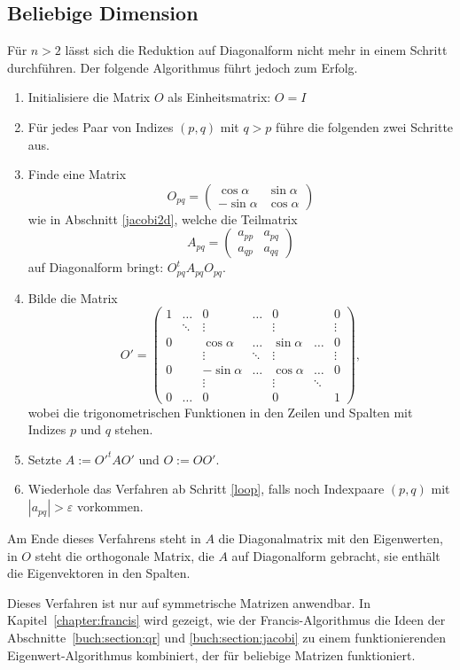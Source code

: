 \subsection{Beliebige Dimension}
Für $n>2$ lässt sich die Reduktion auf Diagonalform nicht mehr in einem
Schritt durchführen. Der folgende Algorithmus führt jedoch zum Erfolg.
\begin{enumerate}
\item Initialisiere die Matrix $O$ als Einheitsmatrix: $O=I$
\item \label{loop} Für jedes Paar von Indizes $(p,q)$ mit $q>p$ führe
die folgenden zwei Schritte aus.
\item Finde eine Matrix
\[
O_{pq}
=
\begin{pmatrix}
 \cos\alpha&\sin\alpha\\
-\sin\alpha&\cos\alpha
\end{pmatrix}
\]
wie in Abschnitt \ref{jacobi2d}, welche die Teilmatrix
\[
A_{pq}=\begin{pmatrix}a_{pp}&a_{pq}\\a_{qp}&a_{qq}\end{pmatrix}
\]
auf Diagonalform bringt: $O_{pq}^tA_{pq}O_{pq}$.
\item Bilde die Matrix
\[
O'=\begin{pmatrix}
1 &\dots &0         &\dots &0          &      &0\\
  &\ddots&\vdots    &      &\vdots     &      &\vdots\\
0 &      &\cos\alpha&\dots &\sin\alpha&\dots &0\\
  &      &\vdots    &\ddots&\vdots     &      &\vdots\\
0 &      &-\sin\alpha&\dots & \cos\alpha&\dots &0\\
  &      &\vdots    &      & \vdots    &\ddots& \\
0 &\dots &0         &      & 0         &      &1
\end{pmatrix},
\]
wobei die trigonometrischen Funktionen in den Zeilen und Spalten mit
Indizes $p$ und $q$ stehen.
\item Setzte $A:=O'^tAO'$ und $O:=OO'$.
\item Wiederhole das Verfahren ab Schritt \ref{loop}, falls noch Indexpaare
$(p,q)$ mit $|a_{pq}|>\varepsilon$ vorkommen.
\end{enumerate}
Am Ende dieses Verfahrens steht in $A$ die Diagonalmatrix mit den
Eigenwerten, in $O$ steht die orthogonale Matrix, die $A$ auf
Diagonalform gebracht, sie enthält die Eigenvektoren in den
Spalten.

Dieses Verfahren ist nur auf symmetrische Matrizen anwendbar.
%
In Kapitel~\ref{chapter:francis} wird gezeigt, wie der
Francis-Algorithmus die Ideen der Abschnitte~\ref{buch:section:qr}
und \ref{buch:section:jacobi} zu einem funktionierenden
Eigenwert-Algorithmus kombiniert, der für beliebige Matrizen funktioniert.
%



